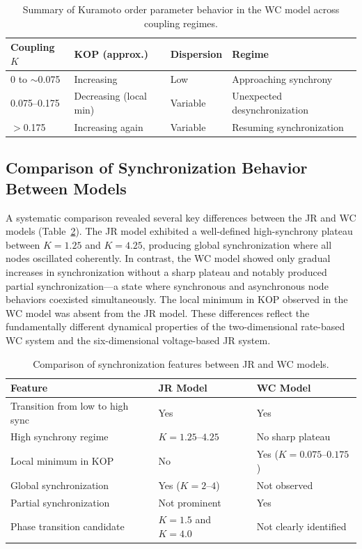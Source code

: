 \documentclass[12pt]{article}
\begin{document}
\begin{table}[H]
\centering
\caption{Summary of Kuramoto order parameter behavior in the WC model across coupling regimes.}
\label{tab:wc_kop}
\begin{tabular}{llll}
\toprule
Coupling $K$ & KOP (approx.) & Dispersion & Regime \\
\midrule
0 to $\sim$0.075 & Increasing & Low & Approaching synchrony \\
0.075--0.175 & Decreasing (local min) & Variable & Unexpected desynchronization \\
$>$0.175 & Increasing again & Variable & Resuming synchronization \\
\bottomrule
\end{tabular}
\end{table}

\subsection{Comparison of Synchronization Behavior Between Models}

A systematic comparison revealed several key differences between the JR and WC models (Table~\ref{tab:comparison}). The JR model exhibited a well-defined high-synchrony plateau between $K = 1.25$ and $K = 4.25$, producing global synchronization where all nodes oscillated coherently. In contrast, the WC model showed only gradual increases in synchronization without a sharp plateau and notably produced partial synchronization---a state where synchronous and asynchronous node behaviors coexisted simultaneously. The local minimum in KOP observed in the WC model was absent from the JR model. These differences reflect the fundamentally different dynamical properties of the two-dimensional rate-based WC system and the six-dimensional voltage-based JR system.

\begin{table}[H]
\centering
\caption{Comparison of synchronization features between JR and WC models.}
\label{tab:comparison}
\begin{tabular}{lll}
\toprule
Feature & JR Model & WC Model \\
\midrule
Transition from low to high sync & Yes & Yes \\
High synchrony regime & $K = 1.25$--$4.25$ & No sharp plateau \\
Local minimum in KOP & No & Yes ($K = 0.075$--$0.175$) \\
Global synchronization & Yes ($K = 2$--$4$) & Not observed \\
Partial synchronization & Not prominent & Yes \\
Phase transition candidate & $K = 1.5$ and $K = 4.0$ & Not clearly identified \\
\bottomrule
\end{tabular}
\end{table}
\end{document}
